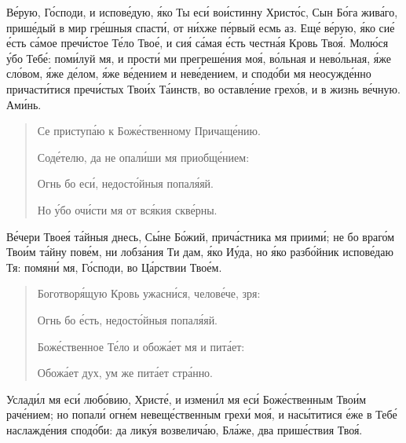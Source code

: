 \begin{mymulticols}
В\'{е}рую, Г\'{о}споди, и испов\'{е}дую, \'{я}ко Ты ес\'{и} во\'{и}стинну Христ\'{о}с, Сын Б\'{о}га жив\'{а}го, приш\'{е}дый в мир гр\'{е}шныя спаст\'{и}, от н\'{и}хже п\'{е}рвый есмь аз. Ещ\'{е} в\'{е}рую, \'{я}ко си\'{е} \'{е}сть с\'{а}мое преч\'{и}стое Т\'{е}ло Тво\'{е}, и си\'{я} с\'{а}мая \'{е}сть честн\'{а}я Кровь Тво\'{я}. Мол\'{ю}ся \'{у}бо Теб\'{е}: пом\'{и}луй мя, и прост\'{и} ми прегреш\'{е}ния мо\'{я}, в\'{о}льная и нев\'{о}льная, \'{я}же сл\'{о}вом, \'{я}же д\'{е}лом, \'{я}же в\'{е}дением и нев\'{е}дением, и спод\'{о}би мя неосужд\'{е}нно причаст\'{и}тися преч\'{и}стых Тво\'{и}х Т\'{а}инств, во оставл\'{е}ние грех\'{о}в, и в жизнь в\'{е}чную. Ам\'{и}нь.


\begin{verse}
Се приступ\'{а}ю к Бож\'{е}ственному Причащ\'{е}нию.

Сод\'{е}телю, да не опал\'{и}ши мя приобщ\'{е}нием:

Огнь бо ес\'{и}, недост\'{о}йныя попал\'{я}яй.

Но \'{у}бо оч\'{и}сти мя от вс\'{я}кия скв\'{е}рны.
\end{verse}


В\'{е}чери Твое\'{я} т\'{а}йныя днесь, С\'{ы}не Б\'{о}жий, прич\'{а}стника мя приим\'{и}; не бо враг\'{о}м Тво\'{и}м т\'{а}йну пов\'{е}м, ни лобз\'{а}ния Ти дам, \'{я}ко И\'{у}да, но \'{я}ко разб\'{о}йник испов\'{е}даю Тя: помян\'{и} мя, Г\'{о}споди, во Ц\'{а}рствии Тво\'{е}м.


\begin{verse}
Боготвор\'{я}щую Кровь ужасн\'{и}ся, челов\'{е}че, зря:

Огнь бо \'{е}сть, недост\'{о}йныя попал\'{я}яй.

Бож\'{е}ственное Т\'{е}ло и обож\'{а}ет мя и пит\'{а}ет:

Обож\'{а}ет дух, ум же пит\'{а}ет стр\'{а}нно.
\end{verse}


Услад\'{и}л мя ес\'{и} люб\'{о}вию, Христ\'{е}, и измен\'{и}л мя ес\'{и} Бож\'{е}ственным Тво\'{и}м рач\'{е}нием; но попал\'{и} огн\'{е}м невещ\'{е}ственным грех\'{и} мо\'{я}, и нас\'{ы}титися \'{е}же в Теб\'{е} наслажд\'{е}ния спод\'{о}би: да лик\'{у}я возвелич\'{а}ю, Бл\'{а}же, два приш\'{е}ствия Тво\'{я}.


\end{mymulticols}
